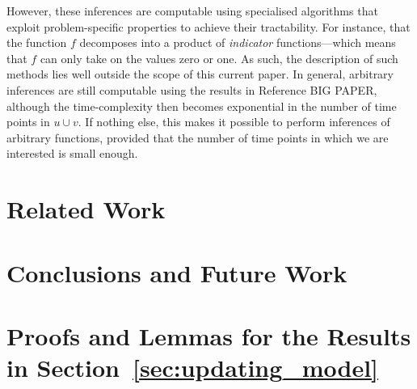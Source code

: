 \documentclass[twoside,11pt]{article}
\begin{document}
However, these inferences are computable using specialised algorithms that exploit problem-specific properties to achieve their tractability. For instance, that the function $f$ decomposes into a product of \emph{indicator} functions---which means that $f$ can only take on the values zero or one. As such, the description of such methods lies well outside the scope of this current paper. In general, arbitrary inferences are still computable using the results in Reference BIG PAPER, although the time-complexity then becomes exponential in the number of time points in $u\cup v$. If nothing else, this makes it possible to perform inferences of arbitrary functions, provided that the number of time points in which we are interested is small enough.

\section{Related Work}\label{sec:related}

\section{Conclusions and Future Work}\label{sec:conclusions}




\newpage

\appendix

\section{Proofs and Lemmas for the Results in Section~\ref{sec:updating_model}}
\end{document}
